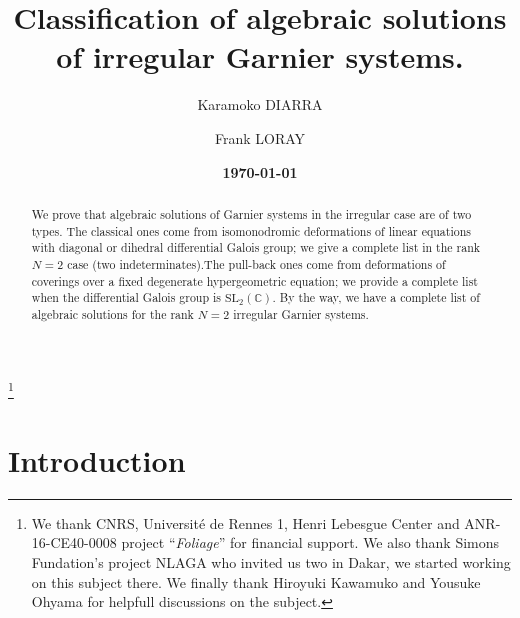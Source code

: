 \documentclass[12]{amsart}
\begin{document}
\author[K. Diarra]{Karamoko DIARRA}
\address{ DER de Math\'ematiques et d'informatique, FAST, Universit\'e des Sciences, des Techniques et des Technologies de Bamako, BP: E $3206$ Mali.}
 
\author[F. Loray]{Frank LORAY}
\address{ Univ Rennes, CNRS, IRMAR - UMR 6625, F-35000 Rennes, France.}

\title[Algebraic solutions of irregular Garnier systems]{Classification of algebraic solutions of irregular Garnier systems.}

\date{\bf \today}
\thanks{We thank CNRS, Universit\'e de Rennes 1, Henri Lebesgue Center and ANR-16-CE40-0008 project ``{\it Foliage}'' for financial support.  We also thank Simons Fundation's project NLAGA who invited us two in Dakar, we started working on this subject there. We finally thank Hiroyuki Kawamuko and Yousuke Ohyama for helpfull discussions
on the subject.}




\begin{abstract} We prove that algebraic solutions of Garnier systems in the irregular case
are of two types. The classical ones come from isomonodromic deformations of linear equations 
with diagonal or dihedral differential Galois group; we give a complete list in the rank $N=2$ case
(two indeterminates).The pull-back ones come from deformations of coverings over a fixed degenerate
hypergeometric equation; we provide a complete list when the differential Galois group is $\mathrm{SL}_2(\mathbb C)$.
By the way, we have a complete list of algebraic solutions for the rank $N=2$ irregular Garnier systems.
\end{abstract}

\maketitle
\tableofcontents

\section{Introduction}
\end{document}
